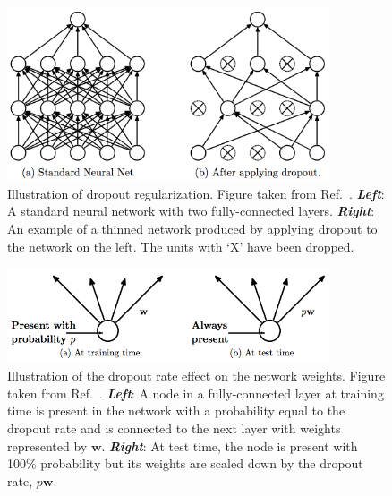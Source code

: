 \begin{figure}[!htb]
    \begin{center}
        \includegraphics[width=0.85\textwidth]{figures/search_hh/mva/dropout_illustration}
        \caption{
            Illustration of dropout regularization. Figure taken from Ref.~\cite{JMLRDropout}.
            \textit{\textbf{Left}}: A standard neural network with two fully-connected layers.
            \textit{\textbf{Right}}: An example of a thinned network produced by applying dropout to the
                network on the left.
                The units with `X' have been dropped.
        }
        \label{fig:dropout_illustration}
    \end{center}
\end{figure}

\begin{figure}[!htb]
    \begin{center}
        \includegraphics[width=0.85\textwidth]{figures/search_hh/mva/dropout_weight_scaling}
        \caption{
            Illustration of the dropout rate effect on the network weights. Figure taken from Ref.~\cite{JMLRDropout}.
            \textit{\textbf{Left}}: A node in a fully-connected layer at training time is present in the network with
                a probability equal to the dropout rate and is connected to the next layer with weights represented by $\bm{w}$.
            \textit{\textbf{Right}}: At test time, the node is present with 100\% probability but its weights are scaled down by the
                dropout rate, $p\bm{w}$.
        }
        \label{fig:dropout_weight_scaling}
    \end{center}
\end{figure}

